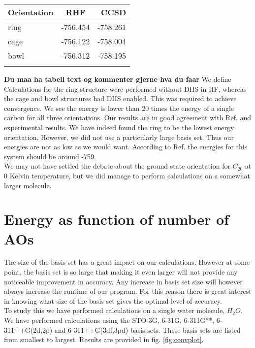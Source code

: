 \begin{center}
\begin{tabular}{ l c r }
	\hline
  	Orientation & RHF & CCSD \\ \hline
  	ring & -756.454 & -758.261  \\ \hline
  	cage & -756.122 & -758.004  \\ \hline
  	bowl & -756.312 & -758.195  \\ \hline
  	\\
	\end{tabular}
\end{center}
{\bf Du maa ha tabell text og kommenter gjerne hva du faar} We define
Calculations for the  ring structure were performed without DIIS in HF, whereas the cage
and bowl structures had DIIS enabled. This was required to achieve
convergence. We see the energy is lower than 20 times the energy of a
single carbon for all three orientations. Our results are in good
agreement with Ref.\cite{c20coordinatesarticlezz10} and experimental
results. We have indeed found the ring to be the lowest energy
orientation. However, we did not use a particularly large basis
set. Thus our energies are not as low as we would want. According to
Ref.\cite{c20article_cite_this} the energies for this system should be
around -759. \\

We may not have settled the debate about the ground state orientation
for $C_{20}$ at 0 Kelvin temperature, but we did manage to perform
calculations on a somewhat larger molecule.

\section{Energy as function of number of AOs}
The size of the basis set has a great impact on our
calculations. However at some point, the basis set is so large that
making it even larger will not provide any noticeable improvement in
accuracy. Any increase in basis set size will however always increase
the runtime of our program. For this reason there is great interest in
knowing what size of the basis set gives the optimal level of accuracy. \\

To study this we have performed calculations on a single water
molecule, $H_2O$. We have performed calculations using the STO-3G,
6-31G, 6-311G**, 6-311++G(2d,2p) and 6-311++G(3df,3pd) basis sets. These basis
sets are listed from smallest to largest. Results are provided in
fig. \ref{fig:convplot}. \\

